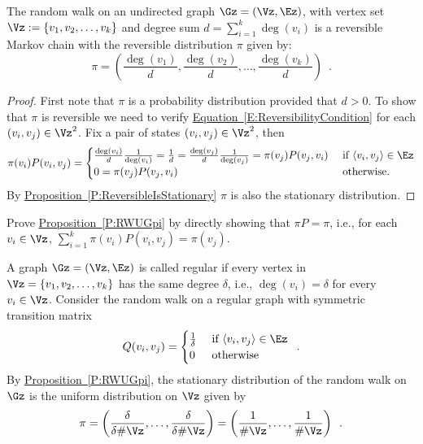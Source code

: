 \begin{prop}\label{P:RWUGpi}
The random walk on an undirected graph $\Gz=(\Vz,\Ez)$, with vertex set $\Vz:= \{v_1,v_2,\ldots,v_k\}$ and degree sum $d = \sum_{i=1}^k{\deg(v_i)}$ is a reversible Markov chain with the reversible distribution $\pi$ given by:
\[
\pi = \left( \frac{\deg(v_1)}{d}, \frac{\deg(v_2)}{d}, \ldots, \frac{\deg(v_k)}{d}  \right) \enspace .
\]
\begin{proof}
First note that $\pi$ is a probability distribution provided that $d > 0$.  
To show that $\pi$ is reversible we need to verify \hyperref[E:ReversibilityCondition]{Equation~\ref*{E:ReversibilityCondition}} for each $(v_i,v_j) \in \Vz^2$.  
Fix a pair of states $(v_i,v_j) \in \Vz^2$, then
\begin{eqnarray*}
\pi(v_i) P(v_i,v_j) = 
\begin{cases}
\frac{\deg(v_i)}{d}\frac{1}{\deg(v_i)}=\frac{1}{d}=\frac{\deg(v_j)}{d}\frac{1}{\deg(v_j)}=\pi(v_j) P(v_j,v_i) & \text{ if } \langle v_i, v_j \rangle \in \Ez\\
0 = \pi(v_j) P(v_j,v_i) & \text{ otherwise}.
\end{cases}
\end{eqnarray*} 
By \hyperref[P:ReversibleIsStationary]{Proposition~\ref*{P:ReversibleIsStationary}} $\pi$ is also the stationary distribution.
\end{proof}
\end{prop}

\begin{exercise}\label{EXR:DirectlyProveRWUGpi}
Prove \hyperref[P:RWUGpi]{Proposition~\ref*{P:RWUGpi}} by directly showing that $\pi P = \pi$, i.e., for each $v_i \in \Vz$, $\sum_{i=1}^k \pi(v_i) P(v_i, v_j) = \pi(v_j)$.
\end{exercise}

\begin{example}\label{EX:RWRegGraph}
A graph $\Gz=(\Vz,\Ez)$ is called regular if every vertex in $\Vz=\{v_1,v_2,\ldots,v_k\}$ has the same degree $\delta$, i.e., $\deg(v_i)=\delta$ for every $v_i \in \Vz$.  
Consider the random walk on a regular graph with symmetric transition matrix 
\[
Q(v_i,v_j) = 
\begin{cases} 
\frac{1}{\delta} & \text{ if } \langle v_i,v_j \rangle \in \Ez \\
0 & \text{ otherwise}
\end{cases} \enspace .
\]
By \hyperref[P:RWUGpi]{Proposition~\ref*{P:RWUGpi}}, the stationary distribution of the random walk on $\Gz$ is the uniform distribution on $\Vz$ given by
\[
\pi 
= \left( \frac{\delta}{\delta \#\Vz }, \ldots , \frac{\delta}{\delta \#\Vz}  \right) 
= \left( \frac{1}{\#\Vz}, \ldots , \frac{1}{\#\Vz} \right) 
\enspace .
\]
\end{example}


